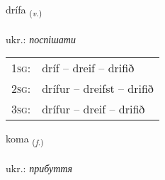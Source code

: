 \documentclass[frontgrid, backgrid]{flacards}\usepackage[]{graphicx}\usepackage[]{xcolor}
\begin{document}
\renewcommand{\flhead}{\vskip5pt \fboxsep=0pt {\small\bfseries\footnotesize Sagnorð | дієслово}}
\renewcommand{\fcfoot}{\vskip5pt \fboxsep=0pt \hspace{2pt}{\small\bfseries\footnotesize 3K}}

\renewcommand{\blhead}{\vskip5pt {\small\bfseries\footnotesize Sagnorð | дієслово }}
\renewcommand{\bcfoot}{\vskip5pt \hspace{2pt}{\small\bfseries\footnotesize 3K}}


{drífa \small{\textsubscript{(\textit{v.})}} \\[1ex] %
\textphonetic{[triːva]} \\
ukr.: \emph{поспішати} \\  [2ex]
\renewcommand*{\arraystretch}{0.8}
\begin{tabular}{p{1cm}l}
\textsc{1sg}: & dríf -- dreif -- drifið \\ 
\textsc{2sg}: & drífur -- dreifst -- drifið \\ 
\textsc{3sg}: & drífur -- dreif -- drifið \\ 
\end{tabular}
}

\renewcommand{\flhead}{\vskip5pt \fboxsep=0pt {\small\bfseries\footnotesize Nafnorð | іменник}}
\renewcommand{\fcfoot}{\vskip5pt \fboxsep=0pt \hspace{2pt}{\small\bfseries\footnotesize 3K}}

\renewcommand{\blhead}{\vskip5pt {\small\bfseries\footnotesize Nafnorð | іменник }}
\renewcommand{\bcfoot}{\vskip5pt \hspace{2pt}{\small\bfseries\footnotesize 3K}}


{koma \small{\textsubscript{(\textit{f.})}} \\[1ex] %
\textphonetic{[kʰɔːma]} \\
ukr.: \emph{прибуття} \\  [2ex]
\renewcommand*{\arraystretch}{0.8}
}
\end{document}
